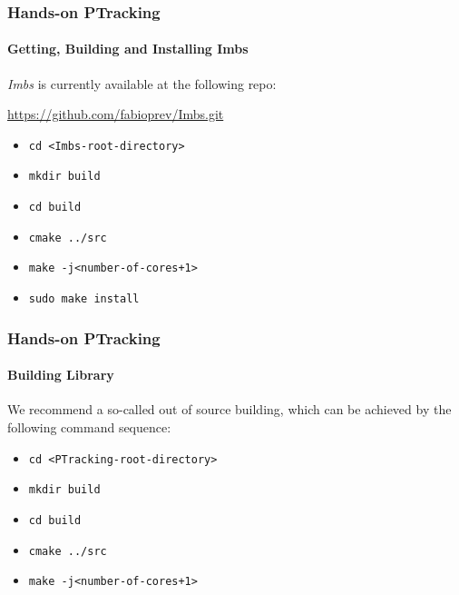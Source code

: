 \begin{frame}
	\frametitle{Hands-on PTracking}
	\framesubtitle{Getting, Building and Installing Imbs}
	
	\Large
	
	\vspace{0.4cm}
	
	\emph{Imbs} is currently available at the following repo:
	\vspace{-0.2cm}
	\begin{center}
		\url{https://github.com/fabioprev/Imbs.git}
	\end{center}
	
	\vspace{-0.2cm}
	
	\begin{itemize}
		\item \texttt{cd <Imbs-root-directory>}
		\item \texttt{mkdir build}
		\item \texttt{cd build}
		\item \texttt{cmake ../src}
		\item \texttt{make -j<number-of-cores+1>}
		\item \texttt{sudo make install}
	\end{itemize}
\end{frame}

\begin{frame}
	\frametitle{Hands-on PTracking}
	\framesubtitle{Building Library}
	
	\Large
	
	We recommend a so-called out of source building, which can be achieved by the following command
	sequence:
	
	\vspace{0.2cm}
	
	\begin{itemize}
		\item \texttt{cd <PTracking-root-directory>}
		\item \texttt{mkdir build}
		\item \texttt{cd build}
		\item \texttt{cmake ../src}
		\item \texttt{make -j<number-of-cores+1>}
	\end{itemize}
\end{frame}

